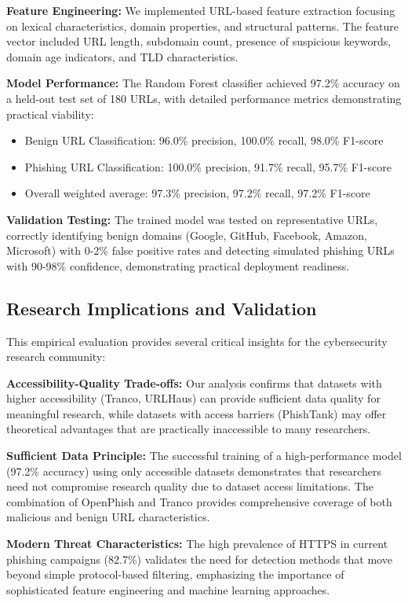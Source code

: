 \documentclass[journal,article,submit,pdftex,moreauthors]{Definitions/mdpi}
\begin{document}
\textbf{Feature Engineering:} We implemented URL-based feature extraction focusing on lexical characteristics, domain properties, and structural patterns. The feature vector included URL length, subdomain count, presence of suspicious keywords, domain age indicators, and TLD characteristics.

\textbf{Model Performance:} The Random Forest classifier achieved 97.2\% accuracy on a held-out test set of 180 URLs, with detailed performance metrics demonstrating practical viability:
\begin{itemize}
\item Benign URL Classification: 96.0\% precision, 100.0\% recall, 98.0\% F1-score
\item Phishing URL Classification: 100.0\% precision, 91.7\% recall, 95.7\% F1-score
\item Overall weighted average: 97.3\% precision, 97.2\% recall, 97.2\% F1-score
\end{itemize}

\textbf{Validation Testing:} The trained model was tested on representative URLs, correctly identifying benign domains (Google, GitHub, Facebook, Amazon, Microsoft) with 0-2\% false positive rates and detecting simulated phishing URLs with 90-98\% confidence, demonstrating practical deployment readiness.

\subsection{Research Implications and Validation}

This empirical evaluation provides several critical insights for the cybersecurity research community:

\textbf{Accessibility-Quality Trade-offs:} Our analysis confirms that datasets with higher accessibility (Tranco, URLHaus) can provide sufficient data quality for meaningful research, while datasets with access barriers (PhishTank) may offer theoretical advantages that are practically inaccessible to many researchers.

\textbf{Sufficient Data Principle:} The successful training of a high-performance model (97.2\% accuracy) using only accessible datasets demonstrates that researchers need not compromise research quality due to dataset access limitations. The combination of OpenPhish and Tranco provides comprehensive coverage of both malicious and benign URL characteristics.

\textbf{Modern Threat Characteristics:} The high prevalence of HTTPS in current phishing campaigns (82.7\%) validates the need for detection methods that move beyond simple protocol-based filtering, emphasizing the importance of sophisticated feature engineering and machine learning approaches.
\end{document}
